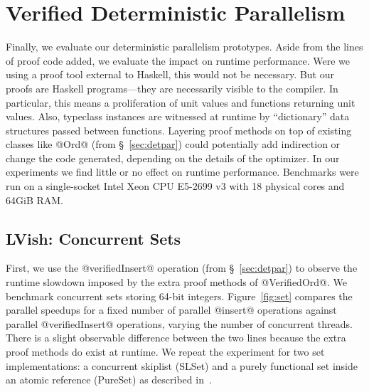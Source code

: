 \section{Verified Deterministic Parallelism}\label{sec:eval-parallelism}

Finally, we evaluate our deterministic
parallelism prototypes.  Aside from the lines of proof code added,
we evaluate the impact on runtime performance.
%
Were we using a proof tool external to Haskell, this would not be necessary.
But our proofs are Haskell programs---they are necessarily visible to the
compiler.  In particular, this means a proliferation of unit values and functions
returning unit values.  Also, typeclass instances are witnessed at runtime by
``dictionary'' data structures passed between functions.  Layering proof methods
on top of existing classes like @Ord@ (from \S~\ref{sec:detpar})
could potentially add indirection or change the
code generated, depending on the details of the optimizer.
%
%
In our experiments we find little or no effect on runtime performance.
Benchmarks were run on a single-socket Intel{\textregistered}
Xeon{\textregistered} CPU E5-2699 v3 with 18 physical cores and 64GiB RAM.

\subsection{LVish: Concurrent Sets}
\label{sec:set}

First, we use the @verifiedInsert@ operation (from \S~\ref{sec:detpar})
to observe the runtime slowdown imposed by the extra proof methods
of @VerifiedOrd@.
We benchmark concurrent sets storing 64-bit integers.
Figure~\ref{fig:set} compares the parallel speedups
for a fixed number of parallel @insert@ operations
against parallel @verifiedInsert@ operations, varying the number of concurrent
threads.
%
There is a slight observable difference between the two
lines because the extra proof methods do exist at runtime.
%
We repeat the experiment for two set implementations: a concurrent skiplist
(SLSet) and a purely functional set inside an atomic reference (PureSet) 
as described in~\cite{kuper2014freeze}.


